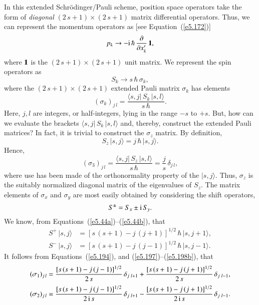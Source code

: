 In this extended Schr\"{o}dinger/Pauli
scheme, position space operators take the form of {\em diagonal}\/ $(2\,s+1) \times (2\,s+1)$
matrix differential operators. Thus, we can represent the momentum operators
as [see
Equation~(\ref{e5.172})]
\begin{equation}
p_k \rightarrow -{\rm i}\,\hbar \,\frac{\partial}{\partial x_k'}\, {\bf 1},
\end{equation}
where ${\bf 1}$ is the $(2\,s+1)\times (2\,s+1)$ unit matrix.
 We represent the spin
operators as
\begin{equation}
S_k \rightarrow s\,\hbar \,\sigma_k,
\end{equation}
where the $(2\,s+1)\times (2\,s+1)$ extended Pauli matrix $\sigma_k$ has elements
\begin{equation}\label{e5.194}
(\sigma_k)_{j\,l} = \frac{ \langle s, j|\,S_k\, | s, l\rangle}{s\,\hbar}.
\end{equation}
Here, $j, l$ are integers, or half-integers, lying in the range $-s$ to $+s$. 
But, how can we evaluate the brackets $\langle s, j|\,S_k \,| s, l\rangle$
and, thereby, construct the extended Pauli matrices? In fact, it is trivial
to construct the $\sigma_z$ matrix. By definition,
\begin{equation}
S_z\, | s, j\rangle = j\,\hbar\, | s, j\rangle.
\end{equation}
Hence, 
\begin{equation}\label{e5.196}
(\sigma_3)_{j\,l} = \frac{\langle s, j|\,S_z\, | s, l\rangle}{s\,\hbar}
= \frac{j}{s}\, \delta_{j\,l},
\end{equation}
where use has been made of the orthonormality property of the $| s, j\rangle$.
Thus, $\sigma_z$ is the suitably normalized diagonal matrix of the eigenvalues
of $S_z$. The matrix elements of $\sigma_x$ and $\sigma_y$ are most easily
obtained by considering the shift operators,
\begin{equation}\label{e5.197}
S^\pm = S_x \pm {\rm i}\, S_y.
\end{equation}
We know, from Equations~(\ref{e5.44a})--(\ref{e5.44b}), that
\begin{align}\label{e5.198a}
S^+\, |s, j\rangle &= [s\,(s+1) - j \,(j+1)]^{1/2} \,\hbar\, |s, j+1\rangle,\\[0.5ex]
S^- \,|s, j\rangle &= [s\,(s+1) - j \,(j-1)]^{1/2}\, \hbar \,|s, j-1\rangle.\label{e5.198b}
\end{align} 
It follows from Equations~(\ref{e5.194}), and (\ref{e5.197})--(\ref{e5.198b}), that
\begin{align}\label{e5.199a}
(\sigma_1)_{j\,l} &= \frac{[s\,(s+1) - j\,(j-1)]^{1/2} }{2\,s}\,\delta_{j\,\, l+1}+ \frac{[s\,(s+1) - j\,(j+1)]^{1/2} }{2\,s}\,\delta_{j\,\, l-1},\\[0.5ex]
(\sigma_2)_{j\,l} &= \frac{[ s\,(s+1) - j\,(j-1)]^{1/2} }{2\,{\rm i}\,s}\,\delta_{j\,\, l+1}- \frac{[s\,(s+1) - j\,(j+1)]^{1/2} }{2\,{\rm i}\,s}\,\delta_{j\,\, l-1}.\label{e5.199b}
\end{align}
